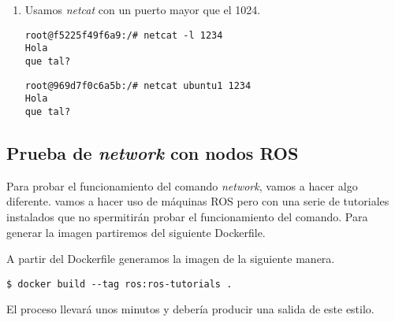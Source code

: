 \begin{enumerate}
\begin{enumerate}
			\item Usamos \textit{netcat} con un puerto mayor que el 1024.
			\begin{lstlisting}[style=consola]
root@f5225f49f6a9:/# netcat -l 1234
Hola
que tal?
			\end{lstlisting}
			\begin{lstlisting}[style=consola]
root@969d7f0c6a5b:/# netcat ubuntu1 1234
Hola
que tal?
			\end{lstlisting}
		\end{enumerate}
	\end{enumerate}
	
{\color{red}

	\subsection{Prueba de \textit{network} con nodos ROS}


	Para probar el funcionamiento del comando \emph{network}, vamos a hacer algo diferente. vamos a hacer uso de máquinas ROS pero con una serie de tutoriales instalados que no spermitirán probar el funcionamiento del comando. Para generar la imagen partiremos del siguiente Dockerfile.

	
	
	A partir del Dockerfile generamos la imagen de la siguiente manera.

	\begin{lstlisting}[style=consola]
$ docker build --tag ros:ros-tutorials .
	\end{lstlisting}

	El proceso llevará unos minutos y debería producir una salida de este estilo.

}
